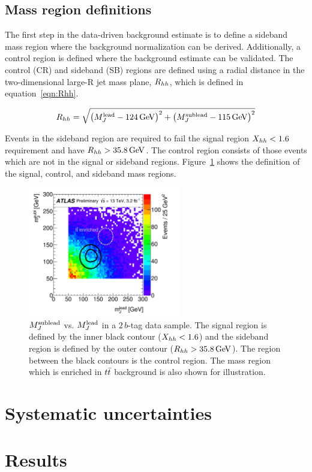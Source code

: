 \subsection{Mass region definitions}

The first step in the data-driven background estimate is to define a sideband mass region where the background normalization can be derived. Additionally, a control region is defined where the background estimate can be validated. The control (CR) and sideband (SB) regions are defined using a radial distance in the two-dimensional large-R jet mass plane, $R_{hh}$, which is defined in equation~\ref{eqn:Rhh}.

\begin{equation}
\label{eqn:Rhh}
\Rhh = \sqrt{\left(M_{J}^{\rm lead} - 124 \GeV\right)^2 + \left(M_{J}^{\rm sublead} - 115 \GeV\right)^2}
\end{equation}

Events in the sideband region are required to fail the signal region $X_{hh} < 1.6$ requirement and have $\Rhh > 35.8 \GeV$. The control region consists of those events which are not in the signal or sideband regions. Figure~\ref{fig:MassRegions} shows the definition of the signal, control, and sideband mass regions.

\begin{figure}[h!]
  \centering
  \captionsetup{justification=centering}

  \includegraphics[width=0.6\textwidth]{figures/MassRegions}
  \caption{$M_{J}^{\rm sublead}$ vs. $M_{J}^{\rm lead}$ in a $2\,b$-tag data sample. The signal region is defined by the inner black contour ($X_{hh} < 1.6$) and the sideband region is defined by the outer contour ($\Rhh > 35.8 \GeV$). The region between the black contours is the control region. The mass region which is enriched in $t\bar{t}$ background is also shown for illustration.~\cite{4bconf}}
  \label{fig:MassRegions}
\end{figure}

\section{Systematic uncertainties}

\section{Results}


